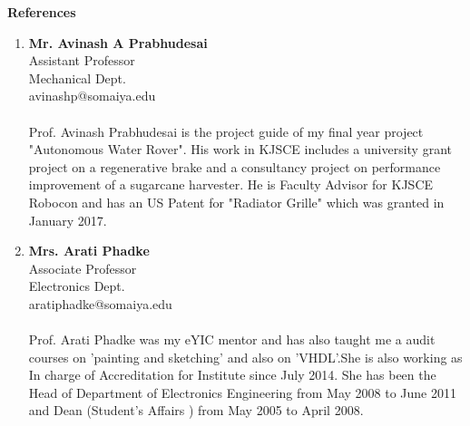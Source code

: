 \documentclass[letterpaper,11pt]{article}
\newcommand{\SmallSep}{\vspace{0.5em}}
\newcommand{\CVSection}[1]
{\Large\textbf{#1}\par
	\SmallSep\normalsize\normalfont}
\begin{document}
\CVSection{References}

\begin{enumerate}
	\item \textbf{Mr. Avinash A Prabhudesai} \\ Assistant Professor\\Mechanical Dept.\\avinashp@somaiya.edu\\
	\textbf{}  \\
	Prof. Avinash Prabhudesai is the project guide of my final year project "Autonomous Water Rover". His work in KJSCE includes a university grant project on a regenerative brake and a consultancy project on performance improvement of a sugarcane harvester. He is Faculty Advisor for KJSCE Robocon and has an US Patent for "Radiator Grille" which was granted in January 2017.
	\item \textbf{Mrs. Arati Phadke} \\ Associate Professor\\Electronics Dept.\\aratiphadke@somaiya.edu\\
	\textbf{}  \\ Prof. Arati Phadke was my eYIC mentor and has also taught me a audit courses on 'painting and sketching' and also on 'VHDL'.She is also working as In charge of Accreditation for Institute since July 2014. She has been the Head of Department of Electronics Engineering from May 2008 to June 2011 and Dean (Student’s Affairs ) from May 2005 to April 2008.
\end{enumerate}
\end{document}
